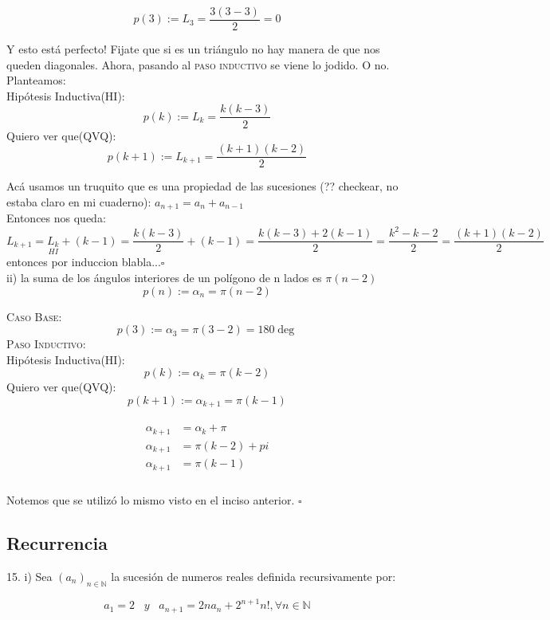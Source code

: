 \documentclass[a4paper,11pt]{article}
\begin{document}
\[p(3) := L_3 = \dfrac{3(3-3)}{2} = 0\]

Y esto está perfecto! Fijate que si es un triángulo no hay manera de que nos queden diagonales. Ahora, pasando al \textsc{paso inductivo} se viene lo jodido. O no. Planteamos:\\
Hipótesis Inductiva(HI):\[ p(k) := L_{k} =\dfrac{k(k-3)}{2} \]
Quiero ver que(QVQ):\[ p(k+1) := L_{k+1} = \dfrac{(k+1)(k-2)}{2} \]

Acá usamos un truquito que es una propiedad de las sucesiones (?? checkear, no estaba claro en mi cuaderno): $a_{n+1} = a_n + a_{n-1}$ \\
Entonces nos queda: \\
$ L_{k+1}  = \underset{HI}{L_k} + (k-1) = \dfrac{k(k-3)}{2} + (k-1) = \dfrac{k(k-3)+2(k-1)}{2} = \dfrac{k^2-k-2}{2}=\dfrac{(k+1)(k-2)}{2}$\\
entonces por induccion blabla...\hfill$\square$\\
ii) la suma de los ángulos interiores de un polígono de n lados es $\pi (n-2)$\\
\[p(n):= \alpha_n = \pi(n-2)\]

\textsc{Caso Base}:\\
\[p(3):= \alpha_3 = \pi(3-2)=180\deg \]
\textsc{Paso Inductivo}:\\
Hipótesis Inductiva(HI):\[p(k):= \alpha_k = \pi(k-2)\]
Quiero ver que(QVQ):\[p(k+1):= \alpha_{k+1} = \pi(k-1)\]

\begin{align*}
\begin{split}
\alpha_{k+1} & = \alpha_k + \pi \\
\alpha_{k+1} & = \pi (k-2) + pi \\
\alpha_{k+1} & = \pi (k - 1) \\
\end{split}
\end{align*}

Notemos que se utilizó lo mismo visto en el inciso anterior.
\hfill$\square$
\subsection{Recurrencia}
15. i) Sea $(a_n)_{n \in \mathbb{N}}$ la sucesión de numeros reales definida recursivamente por: 

\[a_1 = 2 \;\;\;y\;\;\; a_{n+1}=2n a_n + 2^{n+1} n!, \forall n \in \mathbb{N} \]
\end{document}
